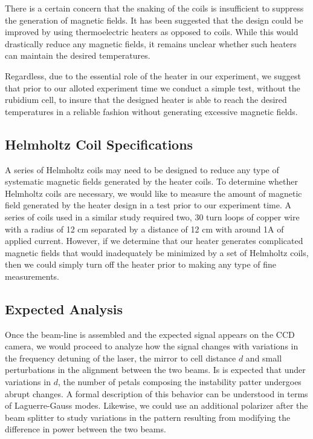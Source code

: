 \documentclass[aps,twocolumn,secnumarabic,balancelastpage,amsmath,amssymb,nofootinbib]{revtex4}
\begin{document}
There is a certain concern that the snaking of the coils is insufficient to suppress the generation of magnetic fields. It has been suggested that the design could be improved by using thermoelectric heaters as opposed to coils. While this would drastically reduce any magnetic fields, it remains unclear whether such heaters can maintain the desired temperatures.

Regardless, due to the essential role of the heater in our experiment, we suggest that prior to our alloted experiment time we conduct a simple test, without the rubidium cell, to insure that the designed heater is able to reach the desired temperatures in a reliable fashion without generating excessive magnetic fields.

\subsection*{Helmholtz Coil Specifications}

A series of Helmholtz coils may need to be designed to reduce any type of systematic magnetic fields generated by the heater coils. To determine whether Helmholtz coils are necessary, we would like to measure the amount of magnetic field generated by the heater design in a test prior to our experiment time. A series of coils used in a similar study required two, 30 turn loops of copper wire with a radius of 12 cm separated by a distance of 12 cm with around 1A of applied current\cite{sclark04}. However, if we determine that our heater generates complicated magnetic fields that would inadequately be minimized by a set of Helmholtz coils, then we could simply turn off the heater prior to making any type of fine measurements. 

\subsection*{Expected Analysis}
Once the beam-line is assembled and the expected signal appears on the CCD camera, we would proceed to analyze how the signal changes with variations in the frequency detuning of the laser, the mirror to cell distance $d$ and small perturbations in the alignment between the two beams. Is is expected that under variations in $d$, the number of petals composing the instability patter undergoes abrupt changes\cite{grynberg93}. A formal description of this behavior can be understood in terms of Laguerre-Gauss modes. Likewise, we could use an additional polarizer after the beam splitter to study variations in the pattern resulting from modifying the difference in power between the two beams.    
\end{document}
